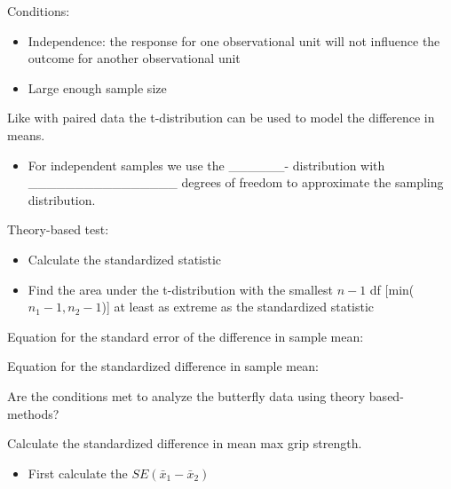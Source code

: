 \documentclass[
]{report}
\providecommand{\tightlist}{%
  \setlength{\itemsep}{0pt}\setlength{\parskip}{0pt}}
\begin{document}
Conditions:

\begin{itemize}
\item
  Independence: the response for one observational unit will not influence the outcome for another observational unit
\item
  Large enough sample size
\end{itemize}

\vspace{1in}

Like with paired data the t-distribution can be used to model the difference in means.


\begin{itemize}
\tightlist
\item
  For independent samples we use the \_\_\_\_\_\_- distribution
  with \_\_\_\_\_\_\_\_\_\_\_\_\_\_\_\_ degrees of freedom to approximate the sampling distribution.
\end{itemize}


Theory-based test:

\begin{itemize}
\item
  Calculate the standardized statistic
\item
  Find the area under the t-distribution with the smallest \(n - 1\) df {[}min(\(n_1-1, n_2-1\)){]} at least as extreme as the standardized statistic
\end{itemize}

Equation for the standard error of the difference in sample mean:

\vspace{0.5in}

Equation for the standardized difference in sample mean:

\vspace{0.5in}

Are the conditions met to analyze the butterfly data using theory based-methods?

\vspace{0.8in}

Calculate the standardized difference in mean max grip strength.

\begin{itemize}
\tightlist
\item
  First calculate the \(SE(\bar{x}_1 - \bar{x}_2)\)
\end{itemize}
\end{document}

